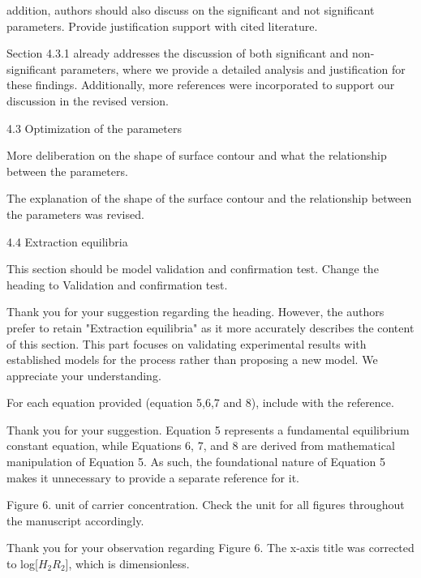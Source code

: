 \documentclass[11pt,answers]{exam}
\begin{document}
\begin{questions}
\question addition, authors should also discuss on the significant and not significant parameters. Provide justification support with cited literature.

\begin{solutionorbox}
Section 4.3.1 already addresses the discussion of both significant and non-significant parameters, where we provide a detailed analysis and justification for these findings. Additionally, more references were incorporated to support our discussion in the revised version.
\end{solutionorbox}


4.3     Optimization of the parameters

\question More deliberation on the shape of surface contour and what the relationship between the parameters.

\begin{solutionorbox}
The explanation of the shape of the surface contour and the relationship between the parameters was revised.
\end{solutionorbox}

4.4     Extraction equilibria

\question This section should be model validation and confirmation test. Change the heading to Validation and confirmation test.

\begin{solutionorbox}
Thank you for your suggestion regarding the heading. However, the authors prefer to retain "Extraction equilibria" as it more accurately describes the content of this section. This part focuses on validating experimental results with established models for the process rather than proposing a new model. We appreciate your understanding.
\end{solutionorbox}


\question For each equation provided (equation 5,6,7 and 8), include with the reference.
\begin{solutionorbox}
Thank you for your suggestion. Equation 5 represents a fundamental equilibrium constant equation, while Equations 6, 7, and 8 are derived from mathematical manipulation of Equation 5. As such, the foundational nature of Equation 5 makes it unnecessary to provide a separate reference for it. 
\end{solutionorbox}

\question Figure 6. unit of carrier concentration. Check the unit for all figures throughout the manuscript accordingly.
\begin{solutionorbox}
Thank you for your observation regarding Figure 6. The x-axis title was corrected to log[$H_2R_2$], which is dimensionless.
\end{solutionorbox}



\end{questions}
\end{document}
